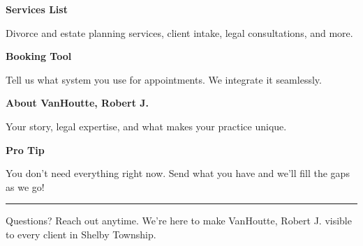 \documentclass[11pt,letterpaper]{article}
\begin{document}
\hfill
\begin{minipage}[t]{0.48\textwidth}
\begin{tcolorbox}[colframe=accent-teal, boxrule=1pt, left=0.7em, right=0.7em, top=0.5em, bottom=0.5em, arc=4pt, boxsep=0pt]
{\bfseries\small\color{accent-teal}Services List}

\vspace{0.15em}

{\small Divorce and estate planning services, client intake, legal consultations, and more.}
\end{tcolorbox}

\vspace{0.1em}

\begin{tcolorbox}[colframe=accent-teal, boxrule=1pt, left=0.7em, right=0.7em, top=0.5em, bottom=0.5em, arc=4pt, boxsep=0pt]
{\bfseries\small\color{accent-teal}Booking Tool}

\vspace{0.15em}

{\small Tell us what system you use for appointments. We integrate it seamlessly.}
\end{tcolorbox}

\vspace{0.1em}

\begin{tcolorbox}[colframe=accent-teal, boxrule=1pt, left=0.7em, right=0.7em, top=0.5em, bottom=0.5em, arc=4pt, boxsep=0pt]
{\bfseries\small\color{accent-teal}About VanHoutte, Robert J.}

\vspace{0.15em}

{\small Your story, legal expertise, and what makes your practice unique.}
\end{tcolorbox}

\vspace{-0.2em}
\end{minipage}

\vspace{0.15em}

\begin{tcolorbox}[colback={accent-red!5}, colframe=accent-red!20, boxrule=0.5pt, left=0.7em, right=0.7em, top=0.4em, bottom=0.4em, arc=6pt, boxsep=0pt]

{\bfseries\small\color{accent-red}Pro Tip}

\vspace{0.1em}

{\small You don't need everything right now. Send what you have and we'll fill the gaps as we go!}

\end{tcolorbox}

\vspace{0.15em}

\noindent\hrule
\vspace{0.2em}

{\small\color{text-light}Questions? Reach out anytime. We're here to make VanHoutte, Robert J. visible to every client in Shelby Township.}
\end{document}
